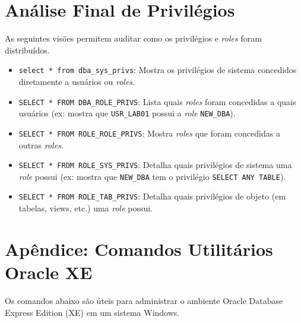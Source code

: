 \documentclass[a4paper, 12pt]{article}
\begin{document}
\section{Análise Final de Privilégios}
As seguintes visões permitem auditar como os privilégios e \textit{roles} foram distribuídos.

\begin{itemize}
    \item \texttt{select * from dba\_sys\_privs}: Mostra os privilégios de sistema concedidos diretamente a usuários ou \textit{roles}.
    \item \texttt{SELECT * FROM DBA\_ROLE\_PRIVS}: Lista quais \textit{roles} foram concedidas a quais usuários (ex: mostra que \texttt{USR\_LAB01} possui a \textit{role} \texttt{NEW\_DBA}).
    \item \texttt{SELECT * FROM ROLE\_ROLE\_PRIVS}: Mostra \textit{roles} que foram concedidas a outras \textit{roles}.
    \item \texttt{SELECT * FROM ROLE\_SYS\_PRIVS}: Detalha quais privilégios de sistema uma \textit{role} possui (ex: mostra que \texttt{NEW\_DBA} tem o privilégio \texttt{SELECT ANY TABLE}).
    \item \texttt{SELECT * FROM ROLE\_TAB\_PRIVS}: Detalha quais privilégios de objeto (em tabelas, views, etc.) uma \textit{role} possui.
\end{itemize}

\section{Apêndice: Comandos Utilitários Oracle XE}
Os comandos abaixo são úteis para administrar o ambiente Oracle Database Express Edition (XE) em um sistema Windows.
\end{document}
